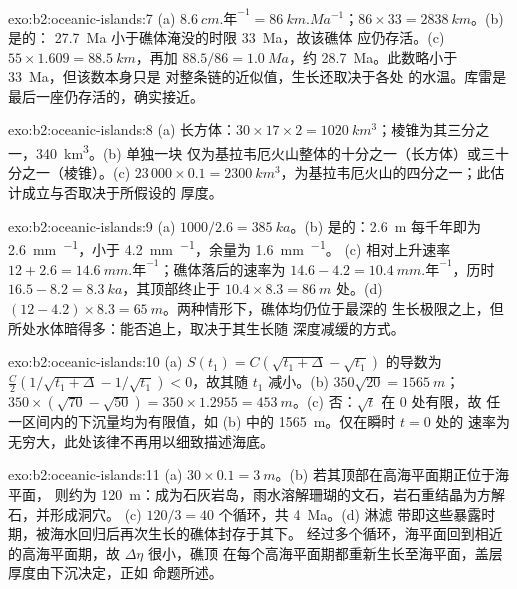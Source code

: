 \begin{solution}{exo:b2:oceanic-islands:7}
(a) $\qty{8.6}{cm.\text{年}^{-1}} = \qty{86}{km.Ma^{-1}}$；$86\times33 = \qty{2838}{km}$。(b) 是的：
\qty{27.7}{Ma} 小于礁体淹没的时限 \qty{33}{Ma}，故该礁体
应仍存活。(c) $55\times1.609 = \qty{88.5}{km}$，再加 $88.5/86 = \qty{1.0}{Ma}$，约
\qty{28.7}{Ma}。此数略小于 \qty{33}{Ma}，但该数本身只是
对整条链的近似值，生长还取决于各处
的水温。库雷是最后一座仍存活的，确实接近。
\end{solution}

\begin{solution}{exo:b2:oceanic-islands:8}
(a) 长方体：$30\times17\times2 = \qty{1020}{km^3}$；棱锥为其三分之一，\qty{340}{km^3}。(b) 单独一块
仅为基拉韦厄火山整体的十分之一（长方体）或三十分之一（棱锥）。(c) $23\,000\times
0.1 = \qty{2300}{km^3}$，为基拉韦厄火山的四分之一；此估计成立与否取决于所假设的
厚度。
\end{solution}

\begin{solution}{exo:b2:oceanic-islands:9}
(a) $1000/2.6 = \qty{385}{ka}$。(b) 是的：\qty{2.6}{m} 每千年即为
\qty{2.6}{mm.^{-1}}，小于 \qty{4.2}{mm.^{-1}}，余量为 \qty{1.6}{mm.^{-1}}。
(c) 相对上升速率 $12 + 2.6 = \qty{14.6}{mm.\text{年}^{-1}}$；礁体落后的速率为 $14.6 - 4.2 =
\qty{10.4}{mm.\text{年}^{-1}}$，历时 $16.5 - 8.2 = \qty{8.3}{ka}$，其顶部终止于 $10.4\times8.3 =
\qty{86}{m}$ 处。(d) $(12 - 4.2)\times8.3 = \qty{65}{m}$。两种情形下，礁体均仍位于最深的
生长极限之上，但所处水体暗得多：能否追上，取决于其生长随
深度减缓的方式。
\end{solution}

\begin{solution}{exo:b2:oceanic-islands:10}
(a) $S(t_1) = C(\sqrt{t_1 + \Delta} - \sqrt{t_1})$ 的导数为 $\frac C2(1/\sqrt{t_1 +
\Delta} - 1/\sqrt{t_1}) < 0$，故其随 $t_1$ 减小。(b) $350\sqrt{20} = \qty{1565}{m}$；$350\times
(\sqrt{70} - \sqrt{50}) = 350\times1.2955 = \qty{453}{m}$。(c) 否：$\sqrt t$ 在 $0$ 处有限，故
任一区间内的下沉量均为有限值，如 (b) 中的 \qty{1565}{m}。仅在瞬时 $t = 0$ 处的
速率为无穷大，此处该律不再用以细致描述海底。
\end{solution}

\begin{solution}{exo:b2:oceanic-islands:11}
(a) $30\times0.1 = \qty{3}{m}$。(b) 若其顶部在高海平面期正位于海平面，
则约为 \qty{120}{m}：成为石灰岩岛，雨水溶解珊瑚的文石，岩石重结晶为方解石，并形成洞穴。
(c) $120/3 = 40$ 个循环，共 \qty{4}{Ma}。(d) 淋滤
带即这些暴露时期，被海水回归后再次生长的礁体封存于其下。
经过多个循环，海平面回到相近的高海平面期，故 $\Delta\eta$ 很小，礁顶
在每个高海平面期都重新生长至海平面，盖层厚度由下沉决定，正如
命题所述。
\end{solution}

